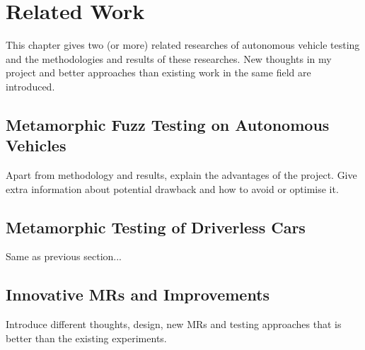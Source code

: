\chapter{Related Work}
\label{ch:related_work} 

This chapter gives two (or more) related researches of autonomous vehicle testing and the methodologies and results of these researches. New thoughts in my project and better approaches than existing work in the same field are introduced.

\section{Metamorphic Fuzz Testing on Autonomous Vehicles}
Apart from methodology and results, explain the advantages of the project. Give extra information about potential drawback and how to avoid or optimise it.

\section{Metamorphic Testing of Driverless Cars}
Same as previous section...

\section{Innovative MRs and Improvements}
Introduce different thoughts, design, new MRs and testing approaches that is better than the existing experiments.

